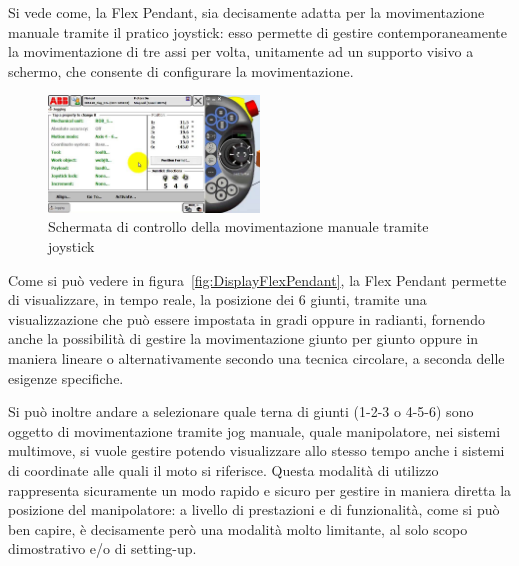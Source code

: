 Si vede come, la Flex Pendant, sia decisamente adatta per la movimentazione manuale tramite il pratico joystick: esso permette di gestire contemporaneamente la movimentazione di tre assi per volta, unitamente ad un supporto visivo a schermo, che consente di configurare la movimentazione.
\begin{figure}[h]
	\centering
	\includegraphics[width=0.5\textwidth]{Immagini/DisplayTPU_ManualJog}
	\caption{Schermata di controllo della movimentazione manuale tramite joystick}
	\label{fig:DisplayFlexPendant}
\end{figure}

Come si può vedere in figura~\vref{fig:DisplayFlexPendant}, la Flex Pendant permette di visualizzare, in tempo reale, la posizione dei 6 giunti, tramite una visualizzazione che può essere impostata in gradi oppure in radianti, fornendo anche la possibilità di gestire la movimentazione giunto per giunto oppure in maniera lineare o alternativamente secondo una tecnica circolare, a seconda delle esigenze specifiche. 

Si può inoltre andare a selezionare quale terna di giunti (1-2-3 o 4-5-6) sono oggetto di movimentazione tramite jog manuale, quale manipolatore, nei sistemi multimove, si vuole gestire potendo visualizzare allo stesso tempo anche i sistemi di coordinate alle quali il moto si riferisce.
Questa modalità di utilizzo rappresenta sicuramente un modo rapido e sicuro per gestire in maniera diretta la posizione del manipolatore: a livello di prestazioni e di funzionalità, come si può ben capire, è decisamente però una modalità molto limitante, al solo scopo dimostrativo e/o di setting-up.
